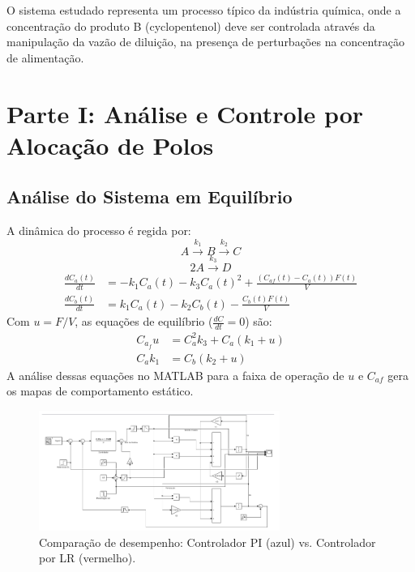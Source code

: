 \documentclass[a4paper,12pt]{report}
\begin{document}
O sistema estudado representa um processo típico da indústria química, onde a concentração do produto B (cyclopentenol) deve ser controlada através da manipulação da vazão de diluição, na presença de perturbações na concentração de alimentação.

\chapter{Parte I: Análise e Controle por Alocação de Polos}
\section{Análise do Sistema em Equilíbrio}
A dinâmica do processo é regida por:
\[ A \xrightarrow{k_1} B \xrightarrow{k_2} C \]
\[ 2A \xrightarrow{k_3} D\]
\begin{align}
\frac{dC_a(t)}{dt} &= -k_1 C_a(t) - k_3 C_a(t)^2 + \frac{(C_{af}(t) - C_a(t)) F(t)}{V} \\
\frac{dC_b(t)}{dt} &= k_1 C_a(t) - k_2 C_b(t) - \frac{C_b(t) F(t)}{V}
\end{align}
Com \(u = F/V\), as equações de equilíbrio (\(\frac{dC}{dt} = 0\)) são:
\begin{align}
C_{a_f} u &= C_a^2 k_3 + C_a (k_1 + u) \\
C_a k_1 &= C_b(k_2 + u)
\end{align}
A análise dessas equações no MATLAB para a faixa de operação de \(u\) e \(C_{af}\) gera os mapas de comportamento estático.

\begin{figure}[H]
    \centering
    \includegraphics[width=0.7\textwidth]{"Trabalho 2 Sistemas de Controle/image1.png"}
    \caption{Comparação de desempenho: Controlador PI (azul) vs. Controlador por LR (vermelho).}
\end{figure}
\end{document}
